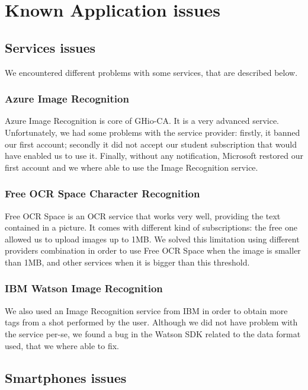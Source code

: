 \section{Known Application issues}
\label{sec:issues}

\subsection{Services issues}

We encountered different problems with some services, that are described below.

\subsubsection{Azure Image Recognition}

Azure Image Recognition is core of GHio-CA. It is a very advanced service.
Unfortunately, we had some problems with the service provider: firstly,
it banned our first account; secondly it did not accept our student
subscription that would have enabled us to use it.
Finally, without any notification, Microsoft restored our first account and we
where able to use the Image Recognition service.

\subsubsection{Free OCR Space Character Recognition}

Free OCR Space is an OCR service that works very well, providing the text contained in a 
picture.
It comes with different kind of subscriptions: the free one allowed us to upload
images up to 1MB. 
We solved this limitation using different providers combination in order to use
Free OCR Space when the image is smaller than 1MB, and other services 
when it is bigger than this threshold.

\subsubsection{IBM Watson Image Recognition}

We also used an Image Recognition service from IBM in order to obtain more tags
from a shot performed by the user.
Although we did not have problem with the service per-se, we found a bug in the 
Watson SDK related to the data format used, that we where able to fix.

\subsection{Smartphones issues}

